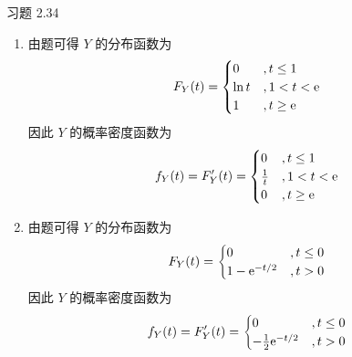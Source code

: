\begin{problem}
    习题 2.34
    \begin{solution}
        \begin{enumerate}
            \item[\textbf{1)}] 由题可得 $Y$ 的分布函数为
            $$
            F_Y(t) = \begin{cases}
                0 &, t \le 1 \\
                \ln t &, 1 < t < \mathrm{e} \\
                1 &, t \ge \mathrm{e}
            \end{cases}
            $$
            因此 $Y$ 的概率密度函数为
            $$
            f_Y(t) = F_Y'(t) = \begin{cases}
                0 &, t \le 1 \\
                \frac{1}{t} &, 1 < t < \mathrm{e} \\
                0 &, t \ge \mathrm{e}
            \end{cases}
            $$

            \item[\textbf{2)}] 由题可得 $Y$ 的分布函数为
            $$
            F_Y(t) = \begin{cases}
                0 &, t \le 0 \\
                1 - \mathrm{e}^{-t / 2} &, t > 0
            \end{cases}
            $$
            因此 $Y$ 的概率密度函数为
            $$
            f_Y(t) = F_Y'(t) = \begin{cases}
                0 &, t \le 0 \\
                -\frac{1}{2} \mathrm{e}^{-t / 2} &, t > 0
            \end{cases}
            $$
        \end{enumerate}
    \end{solution}
\end{problem}

